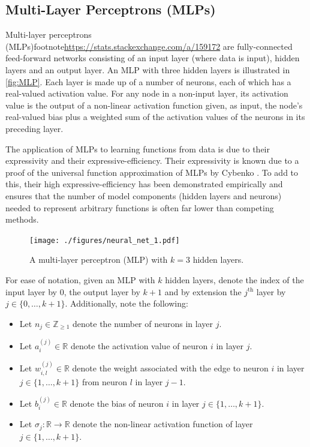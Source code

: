 \documentclass[11pt]{article}
\begin{document}
\subsection{Multi-Layer Perceptrons (MLPs)}

Multi-layer perceptrons (MLPs)footnote{\url{https://stats.stackexchange.com/a/159172}} are fully-connected feed-forward networks consisting of an input layer (where data is input), hidden layers and an output layer. An MLP with three hidden layers is illustrated in \autoref{fig:MLP}. Each layer is made up of a number of neurons, each of which has a real-valued activation value.  For any node in a non-input layer, its activation value is the output of a non-linear activation function given, as input, the node's real-valued bias plus a weighted sum of the activation values of the neurons in its preceding layer.

The application of MLPs to learning functions from data is due to their expressivity and their expressive-efficiency. Their expressivity is known due to a proof of the universal function approximation of MLPs by Cybenko \cite{universal_approx_theorem}. To add to this, their high expressive-efficiency has been demonstrated empirically \cite{exp_eff_of_MLPs} and ensures that the number of model components (hidden layers and neurons) needed to represent arbitrary functions is often far lower than competing methods.

\begin{figure}[H]
    \centering
    \texttt{[image: ./figures/neural\_net\_1.pdf]}
    \caption{\centering A multi-layer perceptron (MLP) with $k=3$ hidden layers.}
    \label{fig:MLP}
\end{figure}
\noindent For ease of notation, given an MLP with $k$ hidden layers, denote the index of the input layer by $0$, the output layer by $k+1$ and by extension the $j^{\text{th}}$ layer by $j\in\{0,\dots,k+1\}$. Additionally, note the following:
\begin{itemize}
    \item Let $n_j\in\mathbb{Z}_{\geq1}$ denote the number of neurons in layer $j$.
    \item Let $a_i^{(j)}\in\mathbb{R}$ denote the activation value of neuron $i$ in layer $j$.
    \item Let $w_{i,l}^{(j)}\in\mathbb{R}$ denote the weight associated with the edge to neuron $i$ in layer $j\in\{1,\dots,k+1\}$ from neuron $l$ in layer $j-1$.
    \item Let $b_i^{(j)}\in\mathbb{R}$ denote the bias of neuron $i$ in layer $j\in\{1,\dots,k+1\}$.
    \item Let $\sigma_j:\mathbb{R}\rightarrow\mathbb{R}$ denote the non-linear activation function of layer $j\in\{1,\dots,k+1\}$.
\end{itemize}
\end{document}

